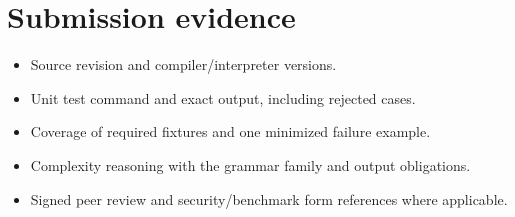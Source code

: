 \documentclass[11pt,letterpaper]{article}
\begin{document}
\section{Submission evidence}
\begin{itemize}\item Source revision and compiler/interpreter versions.\item Unit test command and exact output, including rejected cases.\item Coverage of required fixtures and one minimized failure example.\item Complexity reasoning with the grammar family and output obligations.\item Signed peer review and security/benchmark form references where applicable.\end{itemize}
\end{document}
